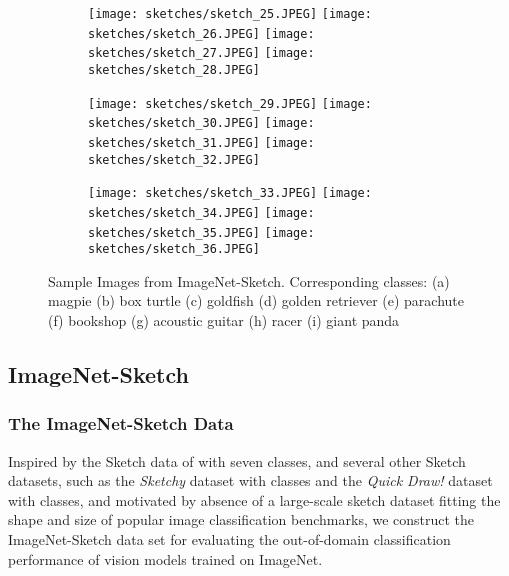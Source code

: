\documentclass{article}
\begin{document}
\begin{figure}
\begin{subfigure}{.1\textwidth}
  \centering
  \texttt{[image: sketches/sketch\_25.JPEG]}
  \texttt{[image: sketches/sketch\_26.JPEG]}
  \texttt{[image: sketches/sketch\_27.JPEG]}
  \texttt{[image: sketches/sketch\_28.JPEG]}
  \caption{}
\end{subfigure}
\begin{subfigure}{.1\textwidth}
  \centering
  \texttt{[image: sketches/sketch\_29.JPEG]}
  \texttt{[image: sketches/sketch\_30.JPEG]}
  \texttt{[image: sketches/sketch\_31.JPEG]}
  \texttt{[image: sketches/sketch\_32.JPEG]}
  \caption{}
\end{subfigure}
\begin{subfigure}{.1\textwidth}
  \centering
  \texttt{[image: sketches/sketch\_33.JPEG]}
  \texttt{[image: sketches/sketch\_34.JPEG]}
  \texttt{[image: sketches/sketch\_35.JPEG]}
  \texttt{[image: sketches/sketch\_36.JPEG]}
  \caption{}
\end{subfigure}

\caption{Sample Images from ImageNet-Sketch. Corresponding classes: (a) magpie (b) box turtle (c) goldfish (d) golden retriever (e) parachute (f) bookshop (g) acoustic guitar (h) racer (i) giant panda}
\label{fig:sketch}
\end{figure}

\subsection{ImageNet-Sketch}
\subsubsection{The ImageNet-Sketch Data}
Inspired by the Sketch data of \citep{li2017deeper} with seven classes, 
and several other Sketch datasets, 
such as the \emph{Sketchy} dataset \citep{sketchy2016} 
with  classes and the \emph{Quick Draw!}
dataset \citep{quickdraw2018} with  classes, 
and motivated by absence of a large-scale sketch dataset 
fitting the shape and size of popular image classification benchmarks,
we construct the ImageNet-Sketch data set for evaluating 
the out-of-domain classification performance of vision models trained on ImageNet. 
\end{document}
